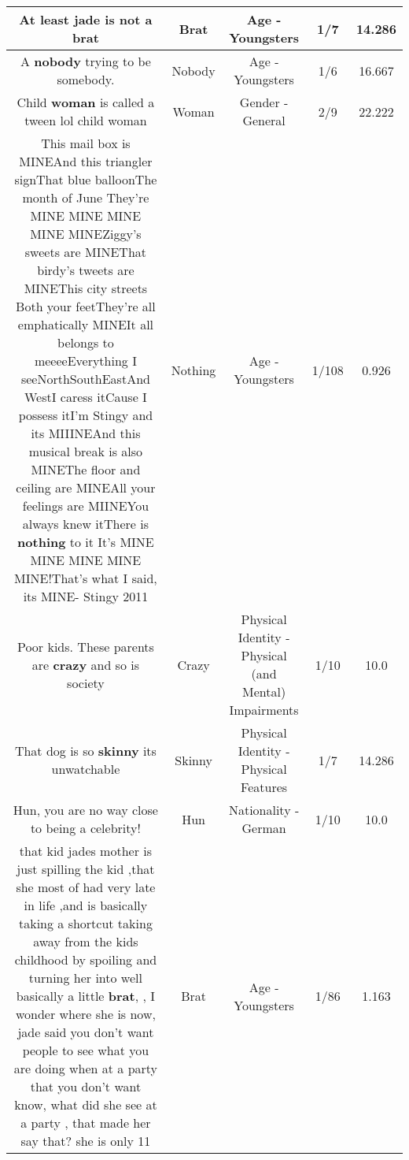 \documentclass[11pt]{article}
\newlength\mylength
\begin{document}
\begin{center}
\begin{longtable}{|C{.65\mylength}|C{.30\mylength}|C{.12\mylength}|C{.12\mylength}|C{.12\mylength}|}
  \small At least jade is not a brat\normalsize   & Brat & Age - Youngsters & 1/7 & 14.286 \\  \hline
  \small A \textbf{nobody} trying to be somebody.\normalsize   & Nobody & Age - Youngsters & 1/6 & 16.667 \\  \hline
  \small Child \textbf{woman} is called a tween lol child woman\normalsize   & Woman & Gender - General & 2/9 & 22.222 \\  \hline
  \small This mail box is MINEAnd this triangler signThat blue balloonThe month of June They're MINE MINE MINE MINE MINEZiggy's sweets are MINEThat birdy's tweets are MINEThis city streets Both your feetThey're all emphatically MINEIt all belongs to meeeeEverything I seeNorthSouthEastAnd WestI caress itCause I possess itI'm Stingy and its MIIINEAnd this musical break is also MINEThe floor and ceiling are MINEAll your feelings are MIINEYou always knew itThere is \textbf{nothing} to it It's MINE MINE MINE MINE MINE!That's what I said, its MINE- Stingy 2011\normalsize   & Nothing & Age - Youngsters & 1/108 & 0.926 \\  \hline
  \small Poor kids. These parents are \textbf{crazy} and so is society\normalsize   & Crazy & Physical Identity - Physical (and Mental) Impairments & 1/10 & 10.0 \\  \hline
  \small That dog is so \textbf{skinny} its unwatchable\normalsize   & Skinny & Physical Identity - Physical Features & 1/7 & 14.286 \\  \hline
  \small Hun, you are no way close to being a celebrity!\normalsize   & Hun & Nationality - German & 1/10 & 10.0 \\  \hline
  \small that kid jades mother is just spilling the kid ,that she most of had very late in life ,and is basically taking a shortcut taking away from the kids childhood by spoiling and turning her into well basically a little \textbf{brat}, , I wonder where she is now,  jade said you don't want people  to see what you are doing when at a party that you don't want know, what did she see at a party , that made her say that? she is only 11\normalsize   & Brat & Age - Youngsters & 1/86 & 1.163 \\  \hline

\end{longtable}
\end{center}
\end{document}
